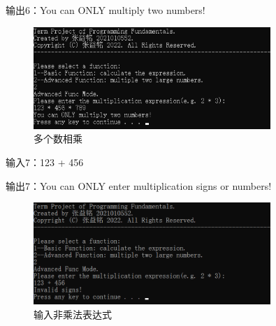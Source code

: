 \documentclass[a4paper, 11pt, UTF8]{ctexart}
\begin{document}
输出6：You can ONLY multiply two numbers!

\begin{figure}[H]
    \centering
    \caption{多个数相乘}
    \includegraphics[width=0.8\textwidth]{t6.png}    
\end{figure}

输入7：123 + 456

输出7：You can ONLY enter multiplication signs or numbers!

\begin{figure}[H]
    \centering
    \caption{输入非乘法表达式}
    \includegraphics[width=0.8\textwidth]{t7.png}    
\end{figure}
\end{document}
